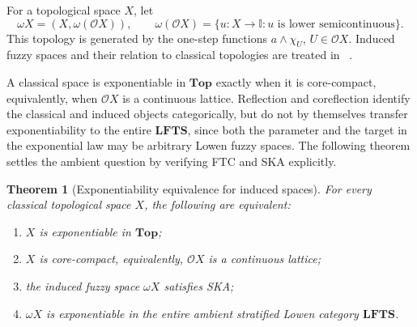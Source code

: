 \documentclass[11pt,a4paper]{article}
\numberwithin{equation}{section}
\newtheorem{theorem}{Theorem}[section]
\theoremstyle{definition}
\theoremstyle{remark}
\newcommand{\I}{\mathbb I}
\newcommand{\LFTS}{\mathbf{LFTS}}
\begin{document}
For a topological space \(X\), let
\[
 \omega X=(X,\omega(\mathcal OX)),
 \qquad
\omega(\mathcal OX)=\{u:X\to\I:u\text{ is lower semicontinuous}\}.
\]
This topology is generated by the one-step functions
\(a\wedge\chi_U\), \(U\in\mathcal OX\).  Induced fuzzy spaces and
their relation to classical topologies are treated in
~\cite{WangHu1985-en,LiuZhang2000-en}.

A classical space is exponentiable in \(\mathbf{Top}\) exactly when it
is core-compact, equivalently, when \(\mathcal OX\) is a continuous
lattice.  Reflection and coreflection identify the classical and
induced objects categorically, but do not by themselves transfer
exponentiability to the entire \(\LFTS\), since both the parameter and
the target in the exponential law may be arbitrary Lowen fuzzy spaces.
The following theorem settles the ambient question by verifying FTC
and SKA explicitly.

\begin{theorem}[Exponentiability equivalence for induced spaces]
\label{thm:induced-equivalence-en}
For every classical topological space \(X\), the following are
equivalent:
\begin{enumerate}[label=\textup{(\roman*)}]
 \item \(X\) is exponentiable in \(\mathbf{Top}\);
 \item \(X\) is core-compact, equivalently, \(\mathcal OX\) is a
 continuous lattice;
 \item the induced fuzzy space \(\omega X\) satisfies SKA;
 \item \(\omega X\) is exponentiable in the entire ambient stratified
 Lowen category \(\LFTS\).
\end{enumerate}
\end{theorem}
\end{document}
